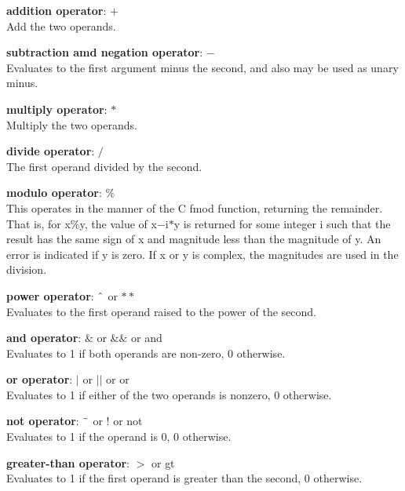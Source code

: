 \begin{description}
\item{{\bf addition operator}: {\vt $+$}}\\
Add the two operands.

\item{{\bf subtraction amd negation operator}: {\vt $-$}}\\
Evaluates to the first argument minus the second, and also may be used
as unary minus.

\item{{\bf multiply operator}: {\vt $*$}}\\
Multiply the two operands.

\item{{\bf divide operator}: {\vt $/$}}\\
The first operand divided by the second.

\item{{\bf modulo operator}: {\vt $\%$}}\\
This operates in the manner of the C {\vt fmod} function, returning
the remainder.  That is, for {\vt x$\%$y}, the value of {\vt
x$-$i$*$y} is returned for some integer {\vt i} such that the result
has the same sign of {\vt x} and magnitude less than the magnitude of
{\vt y}.  An error is indicated if {\vt y} is zero.  If {\vt x} or
{\vt y} is complex, the magnitudes are used in the division.

\item{{\bf power operator}: {\vt $\symbol{94}$} or {\vt $**$}}\\
Evaluates to the first operand raised to the power of the second.

\item{{\bf and operator}: {\vt $\&$} or {\vt $\&\&$} or {\vt and}}\\
Evaluates to 1 if both operands are non-zero, 0 otherwise.

\item{{\bf or operator}: {\vt $|$} or {\vt $||$} or {\vt or}}\\
Evaluates to 1 if either of the two operands is nonzero, 0 otherwise.

\item{{\bf not operator}: {\vt $\symbol{126}$} or {\vt !} or {\vt not}}\\
Evaluates to 1 if the operand is 0, 0 otherwise.

\item{{\bf greater-than operator}: {\vt $>$} or {\vt gt}}\\
Evaluates to 1 if the first operand is greater than the second, 0
otherwise.


\end{description}
